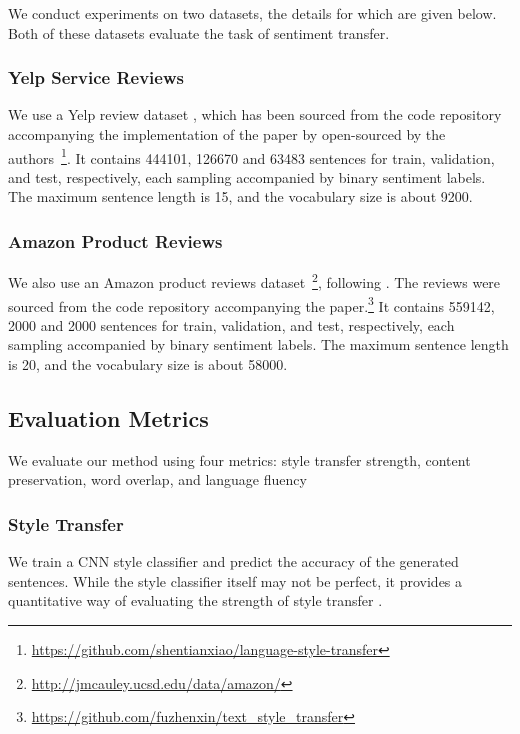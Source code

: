 \documentclass[11pt,a4paper]{article}
\begin{document}
We conduct experiments on two datasets, the details for which are given below. Both of these datasets evaluate the task of sentiment transfer.

\subsubsection{Yelp Service Reviews}

We use a Yelp review dataset \citep{challenge2013yelp}, which has been sourced from the code repository accompanying the implementation of the paper by \citet{shen2017style} open-sourced by the authors~\footnote{\url{https://github.com/shentianxiao/language-style-transfer}}. It contains 444101, 126670 and 63483 sentences for train, validation, and test, respectively, each sampling accompanied by binary sentiment labels. The maximum sentence length is 15, and the vocabulary size is about 9200.

\subsubsection{Amazon Product Reviews}

We also use an Amazon product reviews dataset~\footnote{\url{http://jmcauley.ucsd.edu/data/amazon/}}, following \citet{fu2017style}. The reviews were sourced from the code repository accompanying the paper.\footnote{\url{https://github.com/fuzhenxin/text_style_transfer}} It contains 559142, 2000 and 2000 sentences for train, validation, and test, respectively, each sampling accompanied by binary sentiment labels. The maximum sentence length is 20, and the vocabulary size is about 58000.

\subsection{Evaluation Metrics}

We evaluate our method using four metrics: style transfer strength, content preservation, word overlap, and language fluency

\subsubsection{Style Transfer}
We train a CNN style classifier \cite{kim2014convolutional} and predict the accuracy of the generated sentences. While the style classifier itself may not be perfect, it provides a quantitative way of evaluating the strength of style transfer \cite{hu2017toward,shen2017style,fu2017style}.
\end{document}
